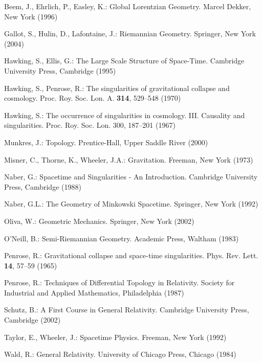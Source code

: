\RGReferenceSection

\begin{description}[style=multiline,leftmargin=5em,labelwidth=4.5em,font=\normalfont]
\item[{[BEE96]}]Beem, J., Ehrlich, P., Easley, K.: Global Lorentzian Geometry. Marcel Dekker, New York (1996)
\item[{[GHL04]}]Gallot, S., Hulin, D., Lafontaine, J.: Riemannian Geometry. Springer, New York (2004)
\item[{[HE95]}]Hawking, S., Ellis, G.: The Large Scale Structure of Space-Time. Cambridge University Press, Cambridge (1995)
\item[{[HP70]}]Hawking, S., Penrose, R.: The singularities of gravitational collapse and cosmology. Proc. Roy. Soc. Lon. A. \textbf{314}, 529--548 (1970)
\item[{[Haw67]}]Hawking, S.: The occurrence of singularities in cosmology. III. Causality and singularities. Proc. Roy. Soc. Lon. 300, 187--201 (1967)
\item[{[Mun00]}]Munkres, J.: Topology. Prentice-Hall, Upper Saddle River (2000)
\item[{[MTW73]}]Misner, C., Thorne, K., Wheeler, J.A.: Gravitation. Freeman, New York (1973)
\item[{[Nab88]}]Naber, G.: Spacetime and Singularities - An Introduction. Cambridge University Press, Cambridge (1988)
\item[{[Nab92]}]Naber, G.L.: The Geometry of Minkowski Spacetime. Springer, New York (1992)
\item[{[Oli02]}]Oliva, W.: Geometric Mechanics. Springer, New York (2002)
\item[{[O’N83]}]
  \begingroup\makeatletter{}\label{bib:ON83}\makeatother\endgroup
  O’Neill, B.: Semi-Riemannian Geometry. Academic Press, Waltham (1983)
\item[{[Pen65]}]Penrose, R.: Gravitational collapse and space-time singularities. Phys. Rev. Lett. \textbf{14}, 57--59 (1965)
\item[{[Pen87]}]Penrose, R.: Techniques of Differential Topology in Relativity. Society for Industrial and Applied Mathematics, Philadelphia (1987)
\item[{[Sch02]}]Schutz, B.: A First Course in General Relativity. Cambridge University Press, Cambridge (2002)
\item[{[TW92]}]Taylor, E., Wheeler, J.: Spacetime Physics. Freeman, New York (1992)
\item[{[Wal84]}]Wald, R.: General Relativity. University of Chicago Press, Chicago (1984)
\end{description}
